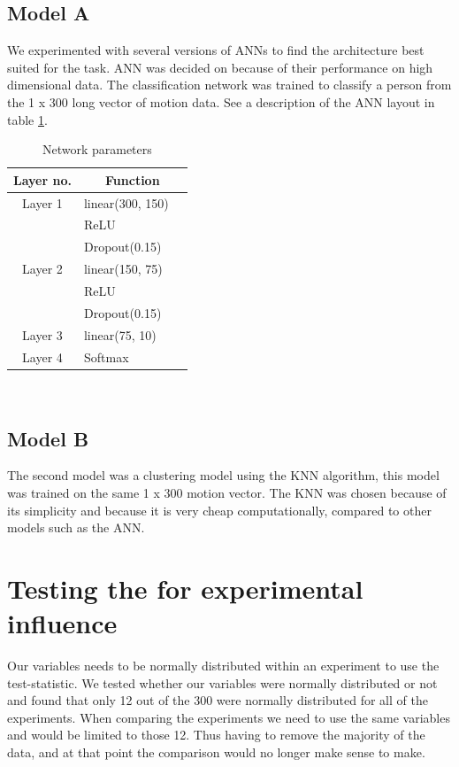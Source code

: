 \documentclass{article}
\begin{document}
\subsection{Model A}
We experimented with several versions of ANNs to find the architecture best suited for the task. ANN was decided on because of their performance on high dimensional data. The classification network was trained to classify a person from the 1 x 300 long vector of motion data. See a description of the ANN layout in table \ref{tab:ann}.

\begin{table}[H]
\centering
\begin{tabular}[H]{c l @{} l}
\centering
Layer no.       &
\multicolumn{2}{c}{Function} \\
\hline
Layer 1     & linear(300, 150) \\
            & ReLU \\
            & Dropout(0.15) \\
Layer 2     & linear(150, 75) \\ 
            & ReLU \\
            & Dropout(0.15) \\
Layer 3     & linear(75, 10) \\ 
Layer 4     & Softmax\\ 
\end{tabular}\\
\caption{Network parameters}
\label{tab:ann} 
\end{table}

\subsection{Model B}
The second model was a clustering model using the KNN algorithm, this model was trained on the same 1 x 300 motion vector.
The KNN was chosen because of its simplicity and because it is very cheap computationally, compared to other models such as the ANN.

\section{Testing the for experimental influence}
Our variables needs to be normally distributed within an experiment to use the test-statistic. We tested whether our variables were normally distributed or not and found that only 12 out of the 300 were normally distributed for all of the experiments. When comparing the experiments we need to use the same variables and would be limited to those 12. Thus having to remove the majority of the data, and at that point the comparison would no longer make sense to make.
\end{document}

